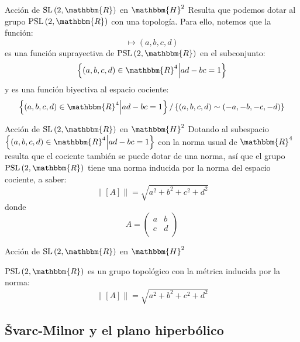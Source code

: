 \documentclass[xcolor=dvipsnames]{beamer}
\theoremstyle{largebreak}
\newcommand{\bbm}[1]{\ensuremath{\mathbbm{#1}}}
\newcommand{\norm}[1]{\|#1\|}
\newcommand{\SL}[1]{\ensuremath{\textup{SL}\left(#1\right)}}
\newcommand{\PSL}[1]{\ensuremath{\textup{PSL}\left(#1\right)}}
\begin{document}
\begin{frame}{Acción de $\SL{2,\bbm{R}}$ en $\bbm{H}^2$}
    Resulta que podemos dotar al grupo $\PSL{2,\bbm{R}}$ con una topología. Para ello, notemos que la función:
    \begin{equation*}
        [A]\mapsto (a,b,c,d)
    \end{equation*}
    es una función suprayectiva de $\PSL{2,\bbm{R}}$ en el subconjunto:
    \begin{equation*}
        \left\{(a,b,c,d)\in\bbm{R}^4\Big|ad-bc=1 \right\}
    \end{equation*}
    y es una función biyectiva al espacio cociente:
    \begin{equation*}
        \left\{(a,b,c,d)\in\bbm{R}^4\Big|ad-bc=1 \right\}/\left\{(a,b,c,d)\sim(-a,-b,-c,-d) \right\}
    \end{equation*}
\end{frame}

\begin{frame}{Acción de $\SL{2,\bbm{R}}$ en $\bbm{H}^2$}
    Dotando al subespacio $\left\{(a,b,c,d)\in\bbm{R}^4\Big|ad-bc=1 \right\}$ con la norma usual de $\bbm{R}^4$ resulta que el cociente también se puede dotar de una norma, así que el grupo $\PSL{2,\bbm{R}}$ tiene una norma inducida por la norma del espacio cociente, a saber:
    \begin{equation*}
        \norm{[A]}=\sqrt{a^2+b^2+c^2+d^2}
    \end{equation*}
    donde
    \begin{equation*}
        A=\left(\begin{array}{cc}
            a & b \\
            c & d \\
        \end{array}\right)
    \end{equation*}
\end{frame}

\begin{frame}{Acción de $\SL{2,\bbm{R}}$ en $\bbm{H}^2$}
    \begin{propo}
        $\PSL{2,\bbm{R}}$ es un grupo topológico con la métrica inducida por la norma:
        \begin{equation*}
            \norm{[A]}=\sqrt{a^2+b^2+c^2+d^2}
        \end{equation*}
    \end{propo}
\end{frame}

\subsection{Švarc-Milnor y el plano hiperbólico}
\end{document}
